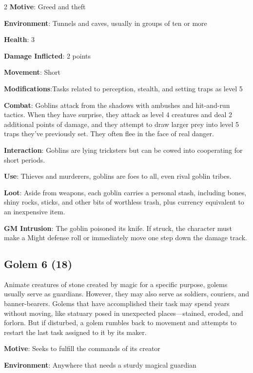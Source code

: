 \begin{multicols}{2}
\textbf{Motive}: Greed and theft

\textbf{Environment}: Tunnels and caves, usually in groups of ten or more

\textbf{Health}: 3

\textbf{Damage Inflicted}: 2 points

\textbf{Movement}: Short

\textbf{Modifications}:Tasks related to perception, stealth, and setting traps as level 5

\textbf{Combat}: Goblins attack from the shadows with ambushes and hit-and-run tactics. When they have surprise, they attack as level 4 creatures and deal 2 additional points of damage, and they attempt to draw larger prey into level 5 traps they’ve previously set. They often flee in the face of real danger.

\textbf{Interaction}: Goblins are lying tricksters but can be cowed into cooperating for short periods.

\textbf{Use}: Thieves and murderers, goblins are foes to all, even rival goblin tribes.

\textbf{Loot}: Aside from weapons, each goblin carries a personal stash, including bones, shiny rocks, sticks, and other bits of worthless trash, plus currency equivalent to an inexpensive item.

\textbf{GM Intrusion}: The goblin poisoned its knife. If struck, the character must make a Might defense roll or immediately move one step down the damage track.

\subsection{Golem	6 (18)}

Animate creatures of stone created by magic for a specific purpose, golems usually serve as guardians. However, they may also serve as soldiers, couriers, and banner-bearers. Golems that have accomplished their task may spend years without moving, like statuary posed in unexpected places—stained, eroded, and forlorn. But if disturbed, a golem rumbles back to movement and attempts to restart the last task assigned to it by its maker.

\textbf{Motive}: Seeks to fulfill the commands of its creator

\textbf{Environment}: Anywhere that needs a sturdy magical guardian


\end{multicols}
